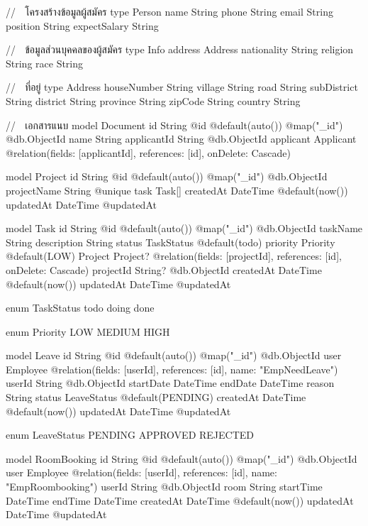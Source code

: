 // 📌 โครงสร้างข้อมูลผู้สมัคร
type Person {
  name         String
  phone        String
  email        String
  position     String
  expectSalary String
}

// 📌 ข้อมูลส่วนบุคคลของผู้สมัคร
type Info {
  address     Address
  nationality String
  religion    String
  race        String
}

// 📌 ที่อยู่
type Address {
  houseNumber String
  village     String
  road        String
  subDistrict String
  district    String
  province    String
  zipCode     String
  country     String
}

// 📌 เอกสารแนบ
model Document {
  id          String    @id @default(auto()) @map("_id") @db.ObjectId
  name        String
  applicantId String    @db.ObjectId
  applicant   Applicant @relation(fields: [applicantId], references: [id], onDelete: Cascade)
}

model Project {
  id          String   @id @default(auto()) @map("_id") @db.ObjectId
  projectName String   @unique
  task        Task[]
  createdAt   DateTime @default(now())
  updatedAt   DateTime @updatedAt
}

model Task {
  id          String     @id @default(auto()) @map("_id") @db.ObjectId
  taskName    String
  description String
  status      TaskStatus @default(todo)
  priority    Priority   @default(LOW)
  Project     Project?   @relation(fields: [projectId], references: [id], onDelete: Cascade)
  projectId   String?    @db.ObjectId
  createdAt   DateTime   @default(now())
  updatedAt   DateTime   @updatedAt
}

enum TaskStatus {
  todo
  doing
  done
}

enum Priority {
  LOW
  MEDIUM
  HIGH
}

model Leave {
  id        String      @id @default(auto()) @map("_id") @db.ObjectId
  user      Employee    @relation(fields: [userId], references: [id], name: "EmpNeedLeave")
  userId    String      @db.ObjectId
  startDate DateTime
  endDate   DateTime
  reason    String
  status    LeaveStatus @default(PENDING)
  createdAt DateTime    @default(now())
  updatedAt DateTime    @updatedAt
}

enum LeaveStatus {
  PENDING
  APPROVED
  REJECTED
}

model RoomBooking {
  id        String   @id @default(auto()) @map("_id") @db.ObjectId
  user      Employee @relation(fields: [userId], references: [id], name: "EmpRoombooking")
  userId    String   @db.ObjectId
  room      String
  startTime DateTime
  endTime   DateTime
  createdAt DateTime @default(now())
  updatedAt DateTime @updatedAt
}

